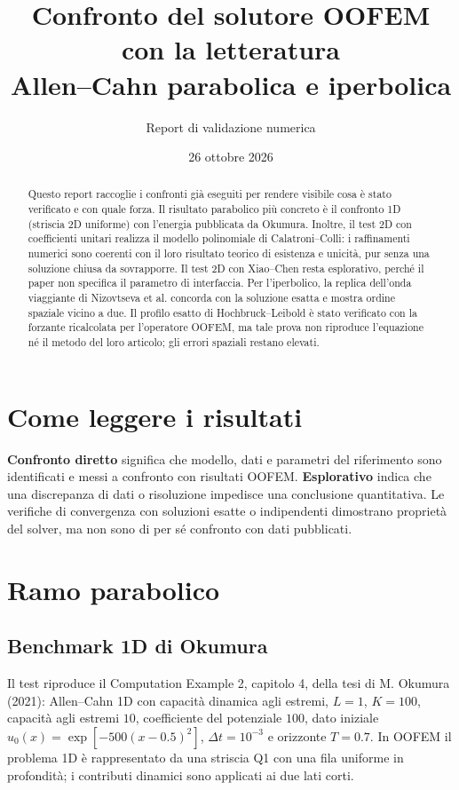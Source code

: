 \documentclass[11pt,a4paper]{article}
\title{Confronto del solutore OOFEM con la letteratura\\\large Allen--Cahn parabolica e iperbolica}
\author{Report di validazione numerica}
\date{26 ottobre 2026}
\begin{document}
\maketitle
\begin{abstract}
Questo report raccoglie i confronti già eseguiti per rendere visibile cosa è stato verificato e con quale forza. Il risultato parabolico più concreto è il confronto 1D (striscia 2D uniforme) con l'energia pubblicata da Okumura. Inoltre, il test 2D con coefficienti unitari realizza il modello polinomiale di Calatroni--Colli: i raffinamenti numerici sono coerenti con il loro risultato teorico di esistenza e unicità, pur senza una soluzione chiusa da sovrapporre. Il test 2D con Xiao--Chen resta esplorativo, perché il paper non specifica il parametro di interfaccia. Per l'iperbolico, la replica dell'onda viaggiante di Nizovtseva et al. concorda con la soluzione esatta e mostra ordine spaziale vicino a due. Il profilo esatto di Hochbruck--Leibold è stato verificato con la forzante ricalcolata per l'operatore OOFEM, ma tale prova non riproduce l'equazione né il metodo del loro articolo; gli errori spaziali restano elevati.
\end{abstract}

\section*{Come leggere i risultati}
\textcolor{green!45!black}{\textbf{Confronto diretto}} significa che modello, dati e parametri del riferimento sono identificati e messi a confronto con risultati OOFEM. \textcolor{orange!80!black}{\textbf{Esplorativo}} indica che una discrepanza di dati o risoluzione impedisce una conclusione quantitativa. Le verifiche di convergenza con soluzioni esatte o indipendenti dimostrano proprietà del solver, ma non sono di per sé confronto con dati pubblicati.

\section{Ramo parabolico}
\subsection{Benchmark 1D di Okumura}
Il test riproduce il Computation Example 2, capitolo 4, della tesi di M. Okumura (2021): Allen--Cahn 1D con capacità dinamica agli estremi, $L=1$, $K=100$, capacità agli estremi $10$, coefficiente del potenziale $100$, dato iniziale $u_0(x)=\exp[-500(x-0.5)^2]$, $\Delta t=10^{-3}$ e orizzonte $T=0.7$. In OOFEM il problema 1D è rappresentato da una striscia Q1 con una fila uniforme in profondità; i contributi dinamici sono applicati ai due lati corti.
\end{document}
